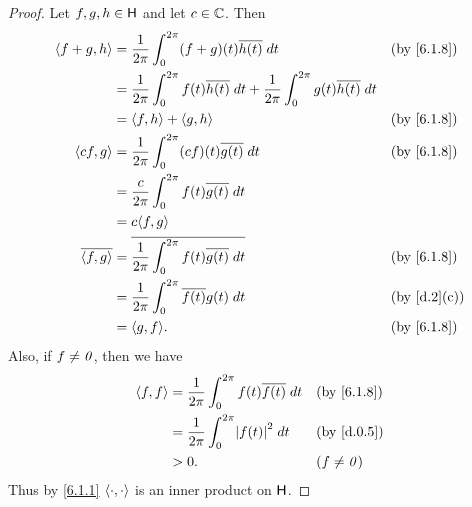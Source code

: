 \begin{proof}
	Let \(f, g, h \in \mathsf{H}\) and let \(c \in \mathbb{C}\).
	Then
	\begin{align*}
		\inn{f + g, h}    & = \frac{1}{2 \pi} \int_0^{2 \pi} (f + g)(t) \conj{h(t)} \; dt                                                   &  & \by{6.1.8}  \\
		                  & = \frac{1}{2 \pi} \int_0^{2 \pi} f(t) \conj{h(t)} \; dt + \frac{1}{2 \pi} \int_0^{2 \pi} g(t) \conj{h(t)} \; dt                  \\
		                  & = \inn{f, h} + \inn{g, h}                                                                                       &  & \by{6.1.8}  \\
		\inn{cf, g}       & = \frac{1}{2 \pi} \int_0^{2 \pi} (cf)(t) \conj{g(t)} \; dt                                                      &  & \by{6.1.8}  \\
		                  & = \frac{c}{2 \pi} \int_0^{2 \pi} f(t) \conj{g(t)} \; dt                                                                          \\
		                  & = c \inn{f, g}                                                                                                                   \\
		\conj{\inn{f, g}} & = \conj{\frac{1}{2 \pi} \int_0^{2 \pi} f(t) \conj{g(t)} \; dt}                                                  &  & \by{6.1.8}  \\
		                  & = \frac{1}{2 \pi} \int_0^{2 \pi} \conj{f(t)} g(t) \; dt                                                         &  & \by{d.2}[c] \\
		                  & = \inn{g, f}.                                                                                                   &  & \by{6.1.8}
	\end{align*}
	Also, if \(f \neq \mathit{0}\), then we have
	\begin{align*}
		\inn{f, f} & = \frac{1}{2 \pi} \int_0^{2 \pi} f(t) \conj{f(t)} \; dt &  & \by{6.1.8}   \\
		           & = \frac{1}{2 \pi} \int_0^{2 \pi} \abs{f(t)}^2 \; dt     &  & \by{d.0.5}   \\
		           & > 0.                                                    &  & (f \neq \zv)
	\end{align*}
	Thus by \cref{6.1.1} \(\left\langle\cdot, \cdot\right\rangle\) is an inner product on \(\mathsf{H}\).
\end{proof}

